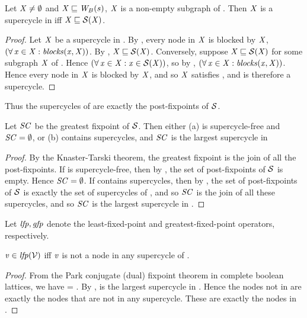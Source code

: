 \begin{proposition} \label{prop:supercycleGFP}
Let $\mathit{X} \ne \emptyset$ and $\mathit{X} \sqsubseteq \mathit{W}_{B}({s})$, \ie $\mathit{X}$ is a non-empty subgraph of . Then $\mathit{X}$ is a supercycle in  iff $\mathit{X} \sqsubseteq \mathcal{S}(\mathit{X})$.
\end{proposition}
%
\begin{proof}
Let $\mathit{X}$ be a supercycle in . By , every node in $\mathit{X}$ is blocked by $\mathit{X}$, \ie 
$(\forall\, \mathit{x} \in \mathit{X}: \mathit{blocks}(\mathit{x}, \mathit{X}))$. By , $\mathit{X} \sqsubseteq \mathcal{S}(\mathit{X})$.
%
Conversely, suppose $\mathit{X} \sqsubseteq \mathcal{S}(\mathit{X})$ for some subgraph $\mathit{X}$ of . Hence 
$(\forall\, \mathit{x} \in \mathit{X}: \mathit{x} \in \mathcal{S}(\mathit{X}))$, so by , $(\forall\, \mathit{x} \in \mathit{X}: \mathit{blocks}(\mathit{x}, \mathit{X}))$.
Hence every node in $\mathit{X}$ is blocked by $\mathit{X}$, and so $\mathit{X}$ satisfies , and is therefore a supercycle.
\end{proof}
%
Thus the supercycles of  are exactly the post-fixpoints of $\mathcal{S}$. %

\begin{proposition} \label{prop:GFPisLargestSC}
Let $\mathit{SC}$ be the greatest fixpoint of $\mathcal{S}$. Then either
(a)  is supercycle-free and $\mathit{SC} = \emptyset$, or 
(b)  contains supercycles, and $\mathit{SC}$ is the largest supercycle in 
\end{proposition}
%
\begin{proof}
By the Knaster-Tarski theorem, the greatest fixpoint is the join of all the post-fixpoints. 
If  is supercycle-free, then by , the set of post-fixpoints of $\mathcal{S}$ is empty. 
Hence $\mathit{SC} = \emptyset$.
If  contains supercycles, then by ,  the set of post-fixpoints of $\mathcal{S}$ is exactly the set of 
supercycles of , and so $\mathit{SC}$ is the join of all these supercycles, and so $\mathit{SC}$ is the largest supercycle in .
\end{proof}

Let $\mathit{lfp}, \mathit{gfp}$ denote the least-fixed-point and greatest-fixed-point operators, respectively.

\begin{proposition}  \label{prop:LFPisScViolations}
$\mathit{v} \in  \mathit{lfp}(\mathcal{V})$ iff $\mathit{v}$ is not a node in any supercycle of .    
\end{proposition}
%
\begin{proof}
From the Park conjugate (dual) fixpoint theorem in complete boolean lattices, we have 
\lfp{\VFs} = \compl{\gfp{\SFs}}.
By , \gfp{\SFs} is the largest supercycle in . Hence the nodes not in 
\gfp{\SFs} are exactly the nodes that are not in any supercycle. These are exactly the nodes in \lfp{\VFs}.
\end{proof}


